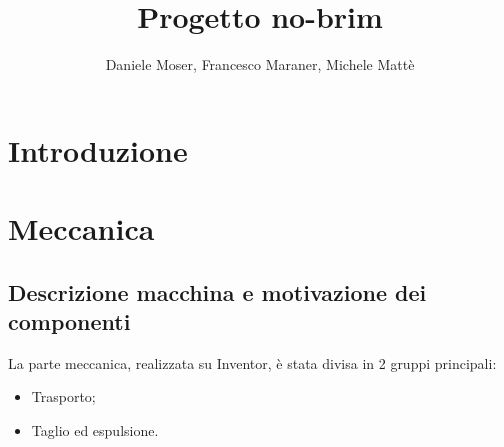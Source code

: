\documentclass{report}
\title{Progetto no-brim}
\author{Daniele Moser, Francesco Maraner, Michele Mattè}
\begin{document}
\maketitle
\tableofcontents

\chapter{Introduzione}

\chapter{Meccanica}


\section{Descrizione macchina e motivazione dei componenti}
La parte meccanica, realizzata su Inventor, è stata divisa in 2 gruppi principali:
\begin{itemize}
\item Trasporto;
\item Taglio ed espulsione.
\end{itemize}
\end{document}
